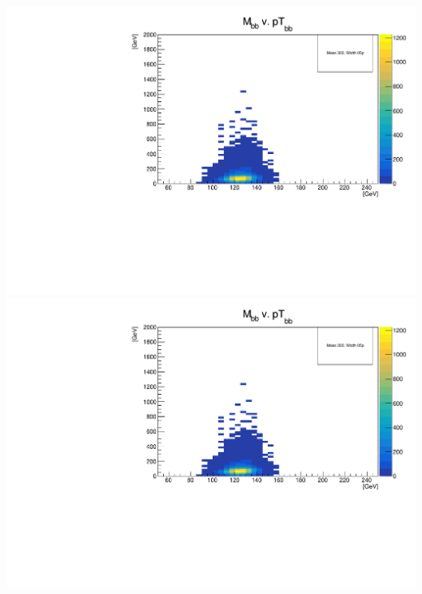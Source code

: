 \documentclass[a4wide,10pt]{article}
\begin{document}
\includegraphics[scale=0.50,page=40]{../Pdfs/Smeared:dib_Mass_Versus_dib_TransverseMomentum_VaryingWidths.pdf}
\includegraphics[scale=0.50,page=41]{../Pdfs/Smeared:dib_Mass_Versus_dib_TransverseMomentum_VaryingWidths.pdf}
\end{document}
